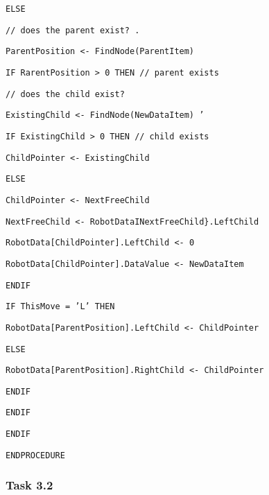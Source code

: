 \begin{minipage}[t]{1\columnwidth}
\texttt{\qquad{}\qquad{}ELSE }

\texttt{\qquad{}\qquad{}\qquad{}// does the parent exist? . }

\texttt{\qquad{}\qquad{}\qquad{}ParentPosition <- FindNode(ParentItem) }

\texttt{\qquad{}\qquad{}\qquad{}IF RarentPosition > 0 THEN // parent
exists }

\texttt{\qquad{}\qquad{}\qquad{}\qquad{}// does the child exist? }

\texttt{\qquad{}\qquad{}\qquad{}\qquad{}ExistingChild <- FindNode(NewDataItem)
' }

\texttt{\qquad{}\qquad{}\qquad{}\qquad{}IF ExistingChild > 0 THEN
// child exists }

\texttt{\qquad{}\qquad{}\qquad{}\qquad{}\qquad{}ChildPointer
<- ExistingChild }

\texttt{\qquad{}\qquad{}\qquad{}\qquad{}ELSE }

\texttt{\qquad{}\qquad{}\qquad{}\qquad{}ChildPointer <- NextFreeChild }

\texttt{\qquad{}\qquad{}\qquad{}\qquad{}NextFreeChild <- RobotDataINextFreeChild\}.LeftChild }

\texttt{\qquad{}\qquad{}\qquad{}\qquad{}RobotData{[}ChildPointer{]}.LeftChild
<- 0 }

\texttt{\qquad{}\qquad{}\qquad{}\qquad{}RobotData{[}ChildPointer{]}.DataValue
<- NewDataItem }

\texttt{\qquad{}\qquad{}\qquad{}\qquad{}ENDIF }

\texttt{\qquad{}\qquad{}\qquad{}\qquad{}IF ThisMove = 'L' THEN }

\texttt{\qquad{}\qquad{}\qquad{}\qquad{}\qquad{}RobotData{[}ParentPosition{]}.LeftChild
<- ChildPointer }

\texttt{\qquad{}\qquad{}\qquad{}\qquad{}ELSE }

\texttt{\qquad{}\qquad{}\qquad{}\qquad{}\qquad{}RobotData{[}ParentPosition{]}.RightChild
<- ChildPointer }

\texttt{\qquad{}\qquad{}\qquad{}\qquad{}ENDIF }

\texttt{\qquad{}\qquad{}\qquad{}ENDIF}\textbf{ }

\texttt{\qquad{}\qquad{}ENDIF }

\texttt{ENDPROCEDURE}%
\end{minipage}

\subsubsection*{Task 3.2}

